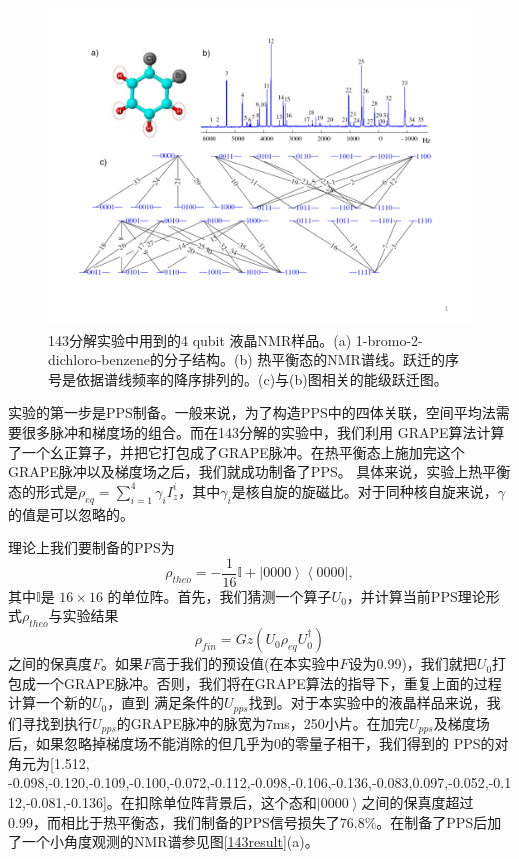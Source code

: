 \begin{figure}[htbp]
            \begin{center}
              \includegraphics[width= 0.8\columnwidth]{figures/143sample.pdf}
              \caption{143分解实验中用到的4 qubit 液晶NMR样品。(a) 1-bromo-2-dichloro-benzene的分子结构。(b) 热平衡态的NMR谱线。跃迁的序号是依据谱线频率的降序排列的。(c)与(b)图相关的能级跃迁图。}
              \label{143sample}
            \end{center}
\end{figure}

实验的第一步是PPS制备。一般来说，为了构造PPS中的四体关联，空间平均法需要很多脉冲和梯度场的组合。而在143分解的实验中，我们利用
GRAPE算法计算了一个幺正算子，并把它打包成了GRAPE脉冲。在热平衡态上施加完这个GRAPE脉冲以及梯度场之后，我们就成功制备了PPS。
具体来说，实验上热平衡态的形式是$\rho_{eq}=\sum_{i=1}^4 \gamma_i I_z^i$，其中$\gamma_i$是核自旋的旋磁比。对于同种核自旋来说，$\gamma$的值是可以忽略的。

理论上我们要制备的PPS为
\begin{equation}\label{aaa}
\rho_{theo}=-\frac{1}{16}\mathbb{{I}}+\left\vert 0000 \right\rangle \left\langle0000\right\vert,
\end{equation}
其中${\mathbb{{I}}}$是 $16\times16$ 的单位阵。首先，我们猜测一个算子$U_0$，并计算当前PPS理论形式$\rho_{theo}$与实验结果
\begin{equation}\label{aaa}
\rho_{fin}=Gz(U_0\rho_{eq}U_0^{\dagger})
\end{equation}
之间的保真度$F$。如果$F$高于我们的预设值(在本实验中$F$设为0.99)，我们就把$U_0$打包成一个GRAPE脉冲。否则，我们将在GRAPE算法的指导下，重复上面的过程计算一个新的$U_0$，直到
满足条件的$U_{pps}$找到。对于本实验中的液晶样品来说，我们寻找到执行$U_{pps}$的GRAPE脉冲的脉宽为7ms，250小片。在加完$U_{pps}$及梯度场后，如果忽略掉梯度场不能消除的但几乎为0的零量子相干，我们得到的
PPS的对角元为[1.512, -0.098,-0.120,-0.109,-0.100,-0.072,-0.112,-0.098,-0.106,-0.136,-0.083,0.097,-0.052,-0.112,-0.081,-0.136]。在扣除单位阵背景后，这个态和$\left\vert 0000 \right\rangle$之间的保真度超过0.99，而相比于热平衡态，我们制备的PPS信号损失了$76.8\%$。在制备了PPS后加了一个小角度观测的NMR谱参见图\ref{143result}(a)。

